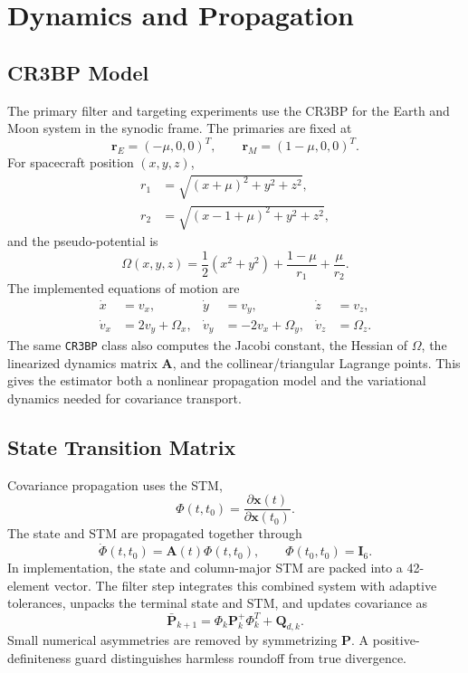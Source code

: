 \documentclass[10pt,twocolumn]{article}
\newcommand{\vect}[1]{\mathbf{#1}}
\newcommand{\mat}[1]{\mathbf{#1}}
\begin{document}
\section{Dynamics and Propagation}
\subsection{CR3BP Model}
The primary filter and targeting experiments use the CR3BP for the Earth and Moon system in the synodic frame.  The primaries are fixed at
\[
\vect{r}_E=(-\mu,0,0)^T,\qquad \vect{r}_M=(1-\mu,0,0)^T.
\]
For spacecraft position $(x,y,z)$,
\begin{align}
r_1 &= \sqrt{(x+\mu)^2+y^2+z^2},\\
r_2 &= \sqrt{(x-1+\mu)^2+y^2+z^2},
\end{align}
and the pseudo-potential is
\begin{equation}
\Omega(x,y,z)=\frac{1}{2}(x^2+y^2)+\frac{1-\mu}{r_1}+\frac{\mu}{r_2}.
\end{equation}
The implemented equations of motion are
\begin{align}
\dot{x} &= v_x, & \dot{y} &= v_y, & \dot{z} &= v_z,\\
\dot{v}_x &= 2v_y+\Omega_x, &
\dot{v}_y &= -2v_x+\Omega_y, &
\dot{v}_z &= \Omega_z.
\end{align}
The same \texttt{CR3BP} class also computes the Jacobi constant, the Hessian of $\Omega$, the linearized dynamics matrix $\mat{A}$, and the collinear/triangular Lagrange points.  This gives the estimator both a nonlinear propagation model and the variational dynamics needed for covariance transport.

\subsection{State Transition Matrix}
Covariance propagation uses the STM,
\[
\Phi(t,t_0)=\frac{\partial \vect{x}(t)}{\partial \vect{x}(t_0)}.
\]
The state and STM are propagated together through
\begin{equation}
\dot{\Phi}(t,t_0)=\mat{A}(t)\Phi(t,t_0), \qquad \Phi(t_0,t_0)=\mat{I}_6.
\end{equation}
In implementation, the state and column-major STM are packed into a 42-element vector.  The filter step integrates this combined system with adaptive tolerances, unpacks the terminal state and STM, and updates covariance as
\begin{equation}
\bar{\vect{P}}_{k+1}
 = \Phi_k\vect{P}_k^+\Phi_k^T+\vect{Q}_{d,k}.
\end{equation}
Small numerical asymmetries are removed by symmetrizing $\vect{P}$.  A positive-definiteness guard distinguishes harmless roundoff from true divergence.
\end{document}
